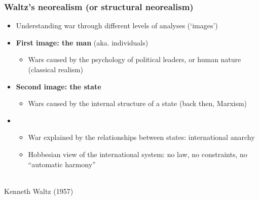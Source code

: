 \documentclass[aspectratio=43,handout]{beamer}
\begin{document}
\begin{frame}
\frametitle{Waltz's neorealism (or structural neorealism)}
\centering


\begin{minipage}{0.71\textwidth}\centering
\begin{itemize}[<+->]
\item Understanding war through different levels of analyses (`images')
\item \textbf{First image: the man} (aka. individuals)
  \begin{itemize}
  \item Wars caused by the psychology of political leaders, or human nature (classical realism)
  \end{itemize}
\item \textbf{Second image: the state}
  \begin{itemize}
  \item Wars caused by the internal structure of a state (back then, Marxism)
  \end{itemize}
\item {}
  \begin{itemize}
  \item War explained by the relationships between states: international anarchy
  \item Hobbesian view of the international system: no law, no constraints, no ``automatic harmony''
  \end{itemize}
\end{itemize}
\end{minipage}\hfill
\begin{minipage}{0.28\textwidth}\centering
{}\\
{\small Kenneth Waltz (1957)}
\end{minipage}

\end{frame}
\end{document}
